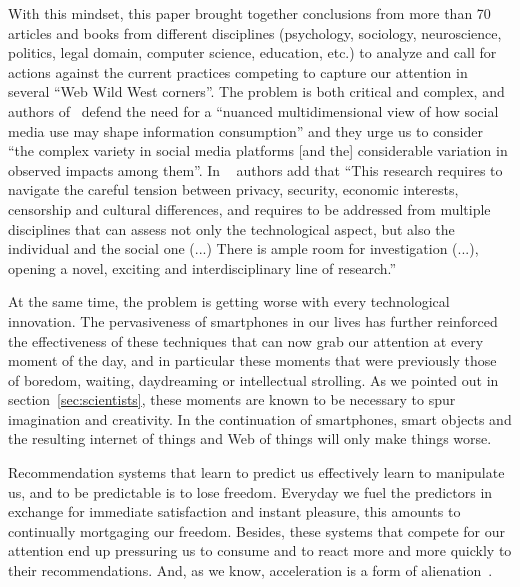 \documentclass[10pt]{article}
\begin{document}
With this mindset, this paper brought together conclusions from more than 70 articles and books  from different disciplines (psychology, sociology, neuroscience, politics, legal domain, computer science, education, etc.) to analyze and call for actions against the current practices competing to capture our attention in several ``Web Wild West corners''.
%
The problem is both critical and complex, and authors of~\cite{kitchens_understanding_2020} defend the need for a ``nuanced multidimensional view of how social media use may shape information consumption'' and they urge us to consider ``the complex variety in social media platforms [and the] considerable variation in observed impacts among them''.
In ~\cite{fernandez_analysing_2021} authors add that 
``This research requires to navigate the careful tension between privacy, security, economic interests, censorship and cultural differences, and requires to be addressed from multiple disciplines that can assess not only the technological aspect, but also the individual and the social one (...) There is ample room for investigation (...), opening a novel, exciting and interdisciplinary line of research.''

At the same time, the problem is getting worse with every technological innovation.
The pervasiveness of smartphones in our lives has further reinforced the effectiveness of these techniques that can now grab our attention at every moment of the day, and in particular these moments that were previously those of boredom, waiting, daydreaming or intellectual strolling. 
As we pointed out in section~\ref{sec:scientists}, these moments are known to be necessary to spur imagination and creativity. In the continuation of smartphones, smart objects and the resulting internet of things and Web of things will only make things worse.

Recommendation systems that learn to predict us effectively learn to manipulate us, and to be predictable is to lose freedom. Everyday we fuel the predictors in exchange for immediate satisfaction and instant pleasure, %
this amounts to continually mortgaging our freedom.
Besides, these systems that compete for our attention end up pressuring us to consume and to react more and more quickly to their recommendations. And, as we know, acceleration is a form of alienation~\cite{rosa2017alienation}.
\end{document}
